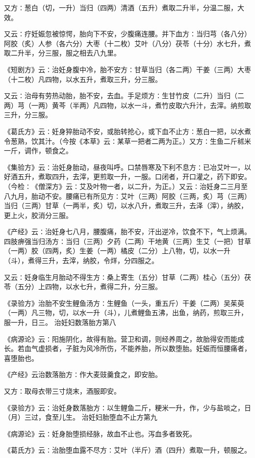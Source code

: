 \documentclass[a4paper,12pt,UTF8,twoside]{ctexbook}
\begin{document}
又方∶葱白（切，一升）当归（四两）清酒（五升）煮取二升半，分温二服，大效。

又云∶疗妊娠忽被惊愕，胎向下不安，少腹痛连腰。并下血方∶当归芎（各八分）阿胶（炙）人参（各六分）大枣（十二枚）艾叶（八分）茯苓（十分）水七升，煮取二升半，分三服，服之相去八九里。

《短剧方》云∶治妊身腹中冷，胎不安方∶甘草当归（各二两）干姜（三两）大枣（十二枚）凡四物，以水五升，煮取三升，分三服。

又云∶治母有劳热动胎，胎不安，去血。手足烦方∶生甘竹皮（二升）当归（二两）芎（一两）黄芩（半两）凡四物，以水一斗，煮竹皮取六升汁，去滓。纳煎取三升，分三服。

《葛氏方》云∶妊身猝胎动不安，或胎转抢心，或下血不止方∶葱白一把，以水煮令葱熟，饮其汁。（今按《本草》云∶某草一把者二两为正。）又方∶生鱼二斤秫米一斤，调作，顿食之。

《集验方》云∶治妊身胎动，昼夜叫呼。口禁唇寒及下利不息方∶已冶艾叶一，以好酒五升，煮取四升，去滓，更煎取一升，一服。口闭者，开口灌之，药下即安。（今检∶《僧深方》云∶艾及叶物一者，以二升，为正。）又云∶治妊身二三月至八九月，胎动不安。腰痛已有所见方∶艾叶（三两）阿胶（三两，炙）芎（三两）当归（三两）甘草（一两半，炙）切，以水八升，煮取三升，去泽（滓），纳胶，更上火，胶消分三服。

《产经》云∶治妊身七八月，腰腹痛，胎不安，汗出逆冷，饮食不下，气上烦满。四肢痹强当归汤方∶当归（三两）夕药（二两）干地黄（三两）生艾（一把）甘草（一两）胶（四两，炙）生姜（一两）橘皮（二分）上八物，切，以水一升（斗），煮得三升，去滓，纳胶，令烊，分四服之。

又云∶妊身临生月胎动不得生方∶桑上寄生（五分）甘草（二两）桂心（五分）茯苓（五分）上四物，以水七升，煮得二升，分三服。

《录验方》治胎不安生鲤鱼汤方∶生鲤鱼（一头，重五斤）干姜（二两）吴茱萸（一两）凡三物，切，以水一升（斗），儿煮鲤鱼五沸，出鱼，纳药，煎取三升，服一升，日三。
治妊妇数落胎方第八

《病源论》云∶阳施阴化，故得有胎。营卫和调，则经养周之，故胎得安而能成长。若血气虚损者，子脏为风冷所伤，不能养胎，所以数堕胎。妊娠而恒腰痛者，喜堕胎也。

《产经》云治数落胎方∶作大麦豉羹食之，即安胎。

又方∶取母衣带三寸烧末，酒服即安。

《录验方》云∶治妊身数落胎方∶以生鲤鱼二斤，粳米一升，作，少与盐啖之，日（月）三过，食至儿生。
治妊妇胎堕血不止方第九

《病源论》云∶妊身胎堕损经脉，故血不止也。泻血多者致死。

《葛氏方》云∶治胎堕血露不尽方∶艾叶（半斤）酒（四升）煮取一升，顿服之。
\end{document}

